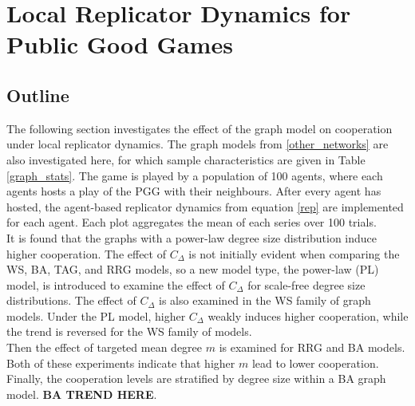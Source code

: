 \section{Local Replicator Dynamics for Public Good Games}
\subsection{Outline}
The following section investigates the effect of the graph model on cooperation under local replicator dynamics. The graph models from \ref{other_networks} are also investigated here, for which sample characteristics are given in Table \ref{graph_stats}. The game is played by a population of 100 agents, where each agents hosts a play of the PGG with their neighbours. After every agent has hosted, the agent-based replicator dynamics from equation \eqref{rep} are implemented for each agent. Each plot aggregates the mean of each series over 100 trials. \\

It is found that the graphs with a power-law degree size distribution induce higher cooperation. The effect of $C_\Delta$ is not initially evident when comparing the WS, BA, TAG, and RRG models, so a new model type, the power-law (PL) model, is introduced to examine the effect of $C_\Delta$ for scale-free degree size distributions. The effect of $C_\Delta$ is also examined in the WS family of graph models. Under the PL model, higher $C_\Delta$ weakly induces higher cooperation, while the trend is reversed for the WS family of models. \\

Then the effect of targeted mean degree $m$ is examined for RRG and BA models. Both of these experiments indicate that higher $m$ lead to lower cooperation. Finally, the cooperation levels are stratified by degree size within a BA graph model. \textbf{BA TREND HERE}.\\

